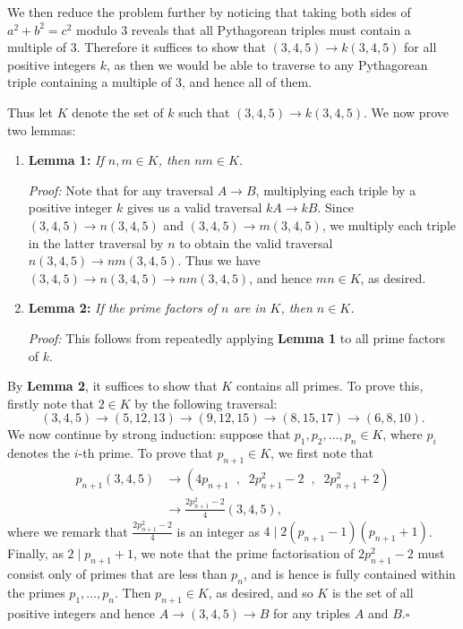 \documentclass[10pt]{article}
\begin{document}
	We then reduce the problem further by noticing that taking both sides of \(a^2 + b^2 = c^2\) modulo 3 reveals that all Pythagorean triples must contain a multiple of 3. Therefore it suffices to show that $(3, 4, 5) \to k(3, 4, 5)$ for all positive integers \(k\), as then we would be able to traverse to any Pythagorean triple containing a multiple of 3, and hence all of them.
	
	Thus let $K$ denote the set of $k$ such that \((3,4,5) \to k(3,4,5)\). We now prove two lemmas:
	
	\begin{enumerate}
	\item \textbf{Lemma 1:} \textit{If \(n, m \in K\), then \(nm \in K\).}
	
	\textit{Proof:} Note that for any traversal \(A \to B\), multiplying each triple by a positive integer \(k\) gives us a valid traversal \(kA \to kB\). Since \((3,4,5) \to n(3, 4, 5)\) and \((3,4,5) \to m(3, 4, 5)\), we multiply each triple in the latter traversal by \(n\) to obtain the valid traversal \(n(3, 4, 5) \to nm(3, 4, 5)\). Thus we have \((3, 4, 5) \to n(3, 4, 5) \to nm(3, 4, 5)\), and hence \(mn \in K\), as desired.
	
	\item \textbf{Lemma 2:} \textit{If the prime factors of \(n\) are in $K$, then $n \in K$.}
	
	\textit{Proof:} This follows from repeatedly applying \textbf{Lemma 1} to all prime factors of $k$.
	\end{enumerate}
	By \textbf{Lemma 2}, it suffices to show that $K$ contains all primes. To prove this, firstly note that $2 \in K$ by the following traversal:
	\[(3, 4, 5) \to (5, 12, 13) \to (9, 12, 15) \to (8, 15, 17) \to (6, 8, 10).\]
	We now continue by strong induction: suppose that $p_1, p_2, \dots, p_n \in K$, where \(p_i\) denotes the \(i\)-th prime. To prove that \(p_{n+1} \in K\), we first note that 
	\begin{align*}
	p_{n+1}(3,4,5) &\to (4p_{n+1} \; \; , \; \; 2p_{n+1}^2 - 2 \; \; , \; \; 2p_{n+1}^2 + 2)\\
	&\to \frac{2p_{n+1}^2-2}{4} (3, 4, 5),
	\end{align*}
	where we remark that \(\frac{2p_{n+1}^2-2}{4}\) is an integer as \(4 \mid 2(p_{n+1}-1)(p_{n+1}+1)\). Finally, as \(2 \mid p_{n+1}+1\), we note that the prime factorisation of \(2p_{n+1}^2 - 2\) must consist only of primes that are less than \(p_n\), and is hence is fully contained within the primes \(p_1, \dots, p_n\). Then \(p_{n+1} \in K\), as desired, and so \(K\) is the set of all positive integers and hence \(A \to (3,4,5) \to B\) for any triples \(A\) and \(B\).\hfill\ensuremath{\square}
	
	
\end{document}
